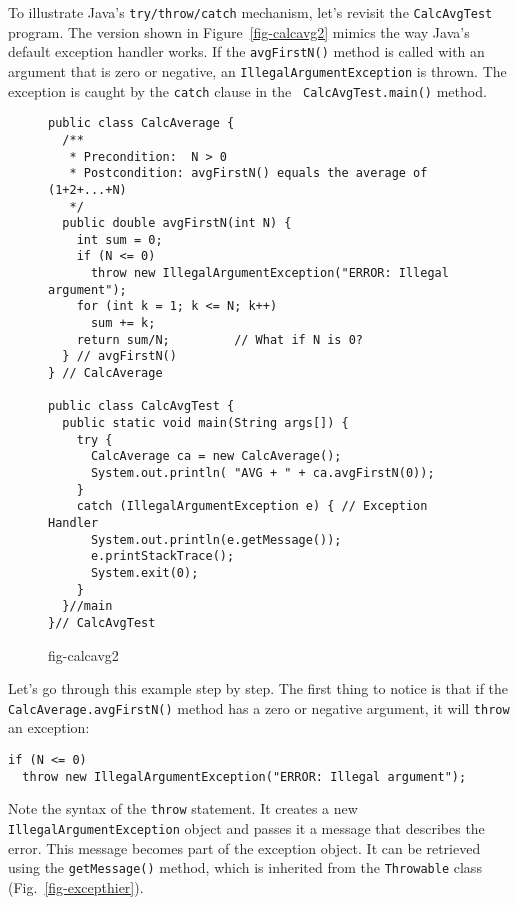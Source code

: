To illustrate Java's {\tt try/throw/catch} mechanism, let's revisit the
{\tt Calc\-Avg\-Test} program.  The version shown in
Figure~\ref{fig-calcavg2} mimics the way Java's default exception
handler works. If the {\tt avgFirstN()} method is called with an
argument that is zero or negative, an {\tt IllegalArgumentException} 
is thrown.  The exception is caught by the {\tt catch} clause in the {\tt
CalcAvgTest.main()} method.

\begin{figure}[tb]
\jjjprogstart
\begin{jjjlisting}[30.5pc]
\begin{lstlisting}
public class CalcAverage {
  /**
   * Precondition:  N > 0
   * Postcondition: avgFirstN() equals the average of (1+2+...+N)
   */
  public double avgFirstN(int N) {
    int sum = 0;
    if (N <= 0)
      throw new IllegalArgumentException("ERROR: Illegal argument");
    for (int k = 1; k <= N; k++)
      sum += k;
    return sum/N;         // What if N is 0?
  } // avgFirstN()
} // CalcAverage

public class CalcAvgTest {
  public static void main(String args[]) {
    try {
      CalcAverage ca = new CalcAverage();
      System.out.println( "AVG + " + ca.avgFirstN(0));        
    } 
    catch (IllegalArgumentException e) { // Exception Handler
      System.out.println(e.getMessage());
      e.printStackTrace();
      System.exit(0);
    }
  }//main
}// CalcAvgTest
\end{lstlisting}
\end{jjjlisting}
{fig-calcavg2}
\end{figure}

Let's go through this example step by step.  The first thing to
notice is that if the {\tt CalcAverage.avg\-FirstN()} method has 
a zero or negative argument, it will {\tt throw} an exception:

\begin{jjjlisting}[28.5pc]
\begin{lstlisting}
if (N <= 0)
  throw new IllegalArgumentException("ERROR: Illegal argument");
\end{lstlisting}
\end{jjjlisting}

\noindent Note the syntax of the {\tt throw} statement.
It creates a new {\tt Illegal\-Argument\-Exception} object and passes
it a message that describes the error. This message becomes part of
the exception object. It can be retrieved using the {\tt getMessage()}
method, which is inherited from the {\tt Throwable} class
(Fig.~\ref{fig-excepthier}).


